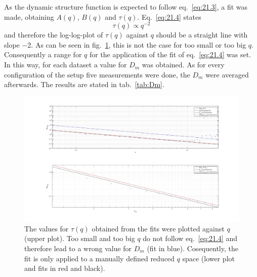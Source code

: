 As the dynamic structure function is expected to follow eq.~\ref{eq:21.3}, a fit was made, obtaining $A(q)$, $B(q)$ and $\tau (q)$. Eq.~\ref{eq:21.4} states 
\begin{equation}
    \tau (q) \propto q^{-2}
\end{equation}
and therefore the log-log-plot of $\tau (q)$ against $q$ should be a straight line with slope \num{-2}. As can be seen in fig.~\ref{fig:tauvsQ}, this is not the case for too small or too big $q$. Consequently a range for $q$ for the application of the fit of eq.~\ref{eq:21.4} was set. In this way, for each dataset a value for $D_m$ was obtained. As for every configuration of the setup five measurements were done, the $D_m$ were averaged afterwards. The results are stated in tab.~\ref{tab:Dm}.

\begin{figure}[ht]
    \centering
    \includegraphics[width = \textwidth]{Bilder/Auswertung/DDM/tauvsQ.jpg}
    \caption{The values for $\tau (q)$ obtained from the fits were plotted against $q$ (upper plot). Too small and too big $q$ do not follow eq.~\ref{eq:21.4} and therefore lead to a wrong value for $D_m$ (fit in blue). Cosequently, the fit is only applied to a manually defined reduced $q$ space (lower plot and fits in red and black).}
    \label{fig:tauvsQ}
\end{figure}

